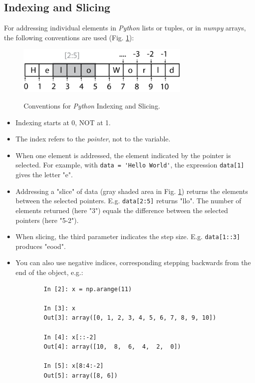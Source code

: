 \subsection{Indexing and Slicing}

For addressing individual elements in \emph{Python} lists or tuples, or in \emph{numpy} arrays, the following conventions are used (Fig. \ref{fig:indexing}):

\begin{figure}[H]
  \centering
  \includegraphics[width=0.75\textwidth]{../Images/IndexingAndSlicing.png}\\
  \caption{Conventions for \emph{Python} Indexing and Slicing.}
  \label{fig:indexing}
\end{figure}

\begin{itemize}
  \item Indexing starts at 0, NOT at 1.
  \item The index refers to the \emph{pointer}, not to the variable.
  \item When one element is addressed, the element indicated by the pointer is selected. For example, with \lstinline{data = 'Hello World'}, the expression \lstinline{data[1]} gives the letter "e".
  \item Addressing a "slice" of data (gray shaded area in Fig. \ref{fig:indexing}) returns the elements between the selected pointers.
        E.g. \lstinline{data[2:5]} returns "llo". The number of elements returned (here "3") equals the difference between the selected pointers (here "5-2").
  \item When slicing, the third parameter indicates the step size. E.g. \lstinline{data[1::3]} produces "eood".
  \item You can also use negative indices, corresponding stepping backwards from the end of the object, e.g.:
    \begin{lstlisting}
        In [2]: x = np.arange(11)

        In [3]: x
        Out[3]: array([0, 1, 2, 3, 4, 5, 6, 7, 8, 9, 10])

        In [4]: x[::-2]
        Out[4]: array([10,  8,  6,  4,  2,  0])

        In [5]: x[8:4:-2]
        Out[5]: array([8, 6])
    \end{lstlisting}

\end{itemize}

